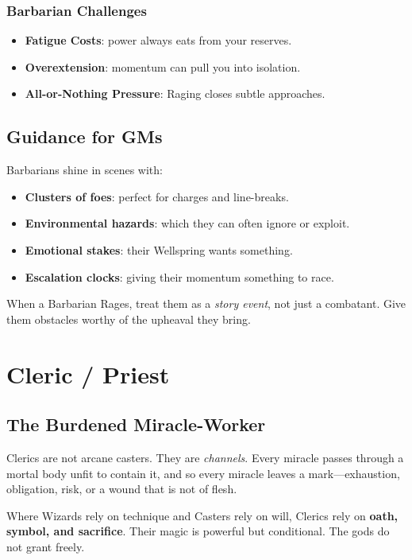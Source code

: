 \documentclass[11pt]{book}
\begin{document}
\subsection{Barbarian Challenges}
\begin{itemize}
  \item \textbf{Fatigue Costs}: power always eats from your reserves.
  \item \textbf{Overextension}: momentum can pull you into isolation.
  \item \textbf{All-or-Nothing Pressure}: Raging closes subtle approaches.
\end{itemize}

\section{Guidance for GMs}
Barbarians shine in scenes with:
\begin{itemize}
  \item \textbf{Clusters of foes}: perfect for charges and line-breaks.
  \item \textbf{Environmental hazards}: which they can often ignore or exploit.
  \item \textbf{Emotional stakes}: their Wellspring wants something.
  \item \textbf{Escalation clocks}: giving their momentum something to race.
\end{itemize}

When a Barbarian Rages, treat them as a \emph{story event}, not just a combatant.
Give them obstacles worthy of the upheaval they bring.

\bigskip

\chapter{Cleric / Priest}
\label{chap:cleric}

\section{The Burdened Miracle-Worker}
Clerics are not arcane casters. They are \emph{channels}.  
Every miracle passes through a mortal body unfit to contain it, and so every miracle leaves a mark---exhaustion, obligation, risk, or a wound that is not of flesh.

Where Wizards rely on technique and Casters rely on will, Clerics rely on \textbf{oath, symbol, and sacrifice}.  
Their magic is powerful but conditional. The gods do not grant freely.
\end{document}
